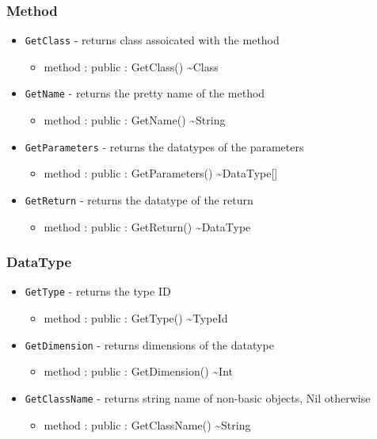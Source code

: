 \documentclass[11pt]{article}
\begin{document}
\subsubsection{Method}
\begin{itemize}

\item \texttt{GetClass} - returns class assoicated with the method
  \begin{itemize}
  \item method : public : GetClass() \textasciitilde Class
  \end{itemize}

\item \texttt{GetName} - returns the pretty name of the method
  \begin{itemize}
  \item method : public : GetName() \textasciitilde String
  \end{itemize}

\item \texttt{GetParameters} - returns the datatypes of the parameters
  \begin{itemize}
  \item method : public : GetParameters() \textasciitilde DataType[]
  \end{itemize}

\item \texttt{GetReturn} - returns the datatype of the return
  \begin{itemize}
  \item method : public : GetReturn() \textasciitilde DataType
  \end{itemize}
\end{itemize}

\subsubsection{DataType}
\begin{itemize}

\item \texttt{GetType} - returns the type ID
  \begin{itemize}
  \item method : public : GetType() \textasciitilde TypeId
  \end{itemize}

\item \texttt{GetDimension} - returns dimensions of the datatype
  \begin{itemize}
  \item method : public : GetDimension() \textasciitilde Int
  \end{itemize}

\item \texttt{GetClassName} - returns string name of non-basic
  objects, Nil otherwise
  \begin{itemize}
  \item method : public : GetClassName() \textasciitilde String
  \end{itemize}
\end{itemize}
\end{document}
